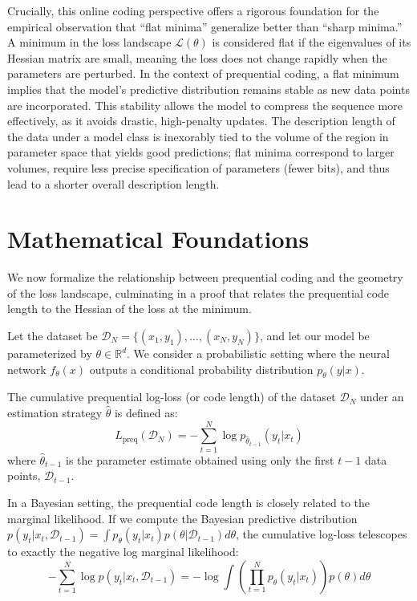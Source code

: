 Crucially, this online coding perspective offers a rigorous foundation for the empirical observation that ``flat minima'' generalize better than ``sharp minima.'' A minimum in the loss landscape $\mathcal{L}(\theta)$ is considered flat if the eigenvalues of its Hessian matrix are small, meaning the loss does not change rapidly when the parameters are perturbed. In the context of prequential coding, a flat minimum implies that the model's predictive distribution remains stable as new data points are incorporated. This stability allows the model to compress the sequence more effectively, as it avoids drastic, high-penalty updates. The description length of the data under a model class is inexorably tied to the volume of the region in parameter space that yields good predictions; flat minima correspond to larger volumes, require less precise specification of parameters (fewer bits), and thus lead to a shorter overall description length.

\section{Mathematical Foundations}

We now formalize the relationship between prequential coding and the geometry of the loss landscape, culminating in a proof that relates the prequential code length to the Hessian of the loss at the minimum.

Let the dataset be $\mathcal{D}_N = \{(x_1, y_1), \dots, (x_N, y_N)\}$, and let our model be parameterized by $\theta \in \mathbb{R}^d$. We consider a probabilistic setting where the neural network $f_\theta(x)$ outputs a conditional probability distribution $p_\theta(y|x)$. 

\begin{definition}
The cumulative prequential log-loss (or code length) of the dataset $\mathcal{D}_N$ under an estimation strategy $\hat{\theta}$ is defined as:
\begin{equation}
    L_{\text{preq}}(\mathcal{D}_N) = -\sum_{t=1}^N \log p_{\hat{\theta}_{t-1}}(y_t | x_t)
\end{equation}
where $\hat{\theta}_{t-1}$ is the parameter estimate obtained using only the first $t-1$ data points, $\mathcal{D}_{t-1}$.
\end{definition}

In a Bayesian setting, the prequential code length is closely related to the marginal likelihood. If we compute the Bayesian predictive distribution $p(y_t | x_t, \mathcal{D}_{t-1}) = \int p_\theta(y_t | x_t) p(\theta | \mathcal{D}_{t-1}) d\theta$, the cumulative log-loss telescopes to exactly the negative log marginal likelihood:
\begin{equation}
    -\sum_{t=1}^N \log p(y_t | x_t, \mathcal{D}_{t-1}) = -\log \int \left( \prod_{t=1}^N p_\theta(y_t | x_t) \right) p(\theta) d\theta
\end{equation}

